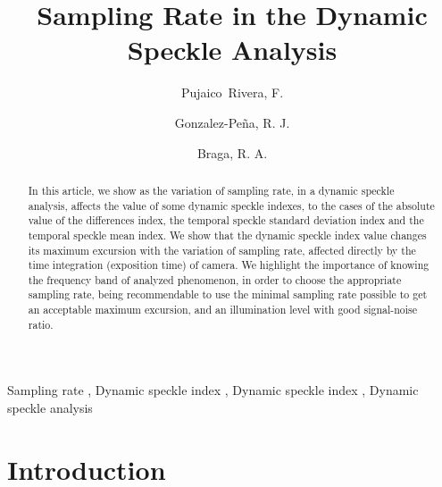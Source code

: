 \documentclass[review]{elsarticle}
\begin{document}
 

\begin{frontmatter}

\title{Sampling Rate in the Dynamic Speckle Analysis}



\author{Pujaico~Rivera, F.}
\author{Gonzalez-Pe\~na, R. J.}
\author{Braga, R. A.}



\address{University Federal of Lavras, Lavras, Brazil}
% 


\begin{abstract}
In this article, we show as the variation of sampling rate, 
in a dynamic speckle analysis, affects the value of some dynamic speckle indexes, 
to the cases of the absolute value of the differences index, 
the temporal speckle standard deviation index and the temporal speckle mean index.
We show that  the dynamic speckle index value changes its maximum excursion with 
the variation of sampling rate, affected directly by the time integration 
(exposition time) of camera.
We highlight the importance of knowing  the frequency band of analyzed phenomenon, 
in order to choose the appropriate sampling rate, 
being recommendable to use the minimal sampling rate possible
to get an acceptable maximum excursion, 
and an illumination level with good signal-noise ratio.

\end{abstract}

\begin{keyword}
Sampling rate \sep
Dynamic speckle index \sep 
Dynamic speckle index \sep 
Dynamic speckle analysis
\end{keyword}

\end{frontmatter}

\linenumbers


\section{Introduction}
\end{document}
